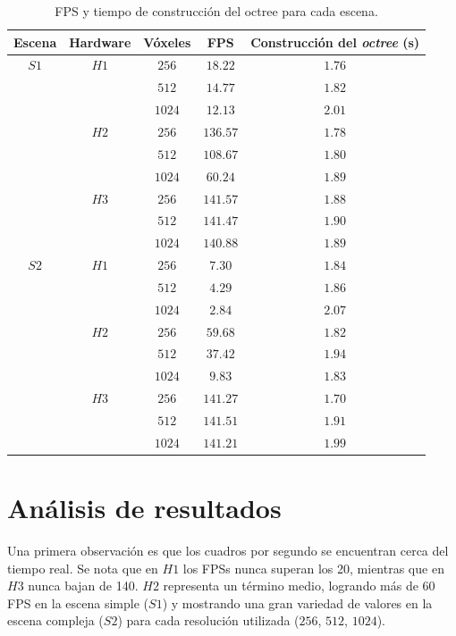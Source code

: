 \begin{table}[ht]
\centering
\begin{tabular}{|c|c|c|c|c|}
	\hline
	\textbf{Escena} & \textbf{Hardware} & \textbf{Vóxeles} & \textbf{FPS} & \textbf{Construcción del \textit{octree} (s)} \\
	\hline
	$S1$ & $H1$ & $256$ & $18.22$ & $1.76$ \\
	\cline{3-5}
	 & & $512$ & $14.77$ & $1.82$ \\
	\cline{3-5}
	 & & $1024$ & $12.13$ & $2.01$ \\
	\cline{2-5}
	 & $H2$ & $256$ & $136.57$ & $1.78$ \\
	\cline{3-5}
	 & & $512$ & $108.67$ & $1.80$ \\
	\cline{3-5}
	 & & $1024$ & $60.24$ & $1.89$ \\
	\cline{2-5}
	 & $H3$ & $256$ & $141.57$ & $1.88$ \\
	\cline{3-5}
	 & & $512$ & $141.47$ & $1.90$ \\
	\cline{3-5}
	 & & $1024$ & $140.88$ & $1.89$ \\
	\hline
	$S2$ & $H1$ & $256$ & $7.30$ & $1.84$ \\
	\cline{3-5}
	 & & $512$ & $4.29$ & $1.86$ \\
	\cline{3-5}
	 & & $1024$ & $2.84$ & $2.07$ \\
	\cline{2-5}
	 & $H2$ & $256$ & $59.68$ & $1.82$ \\
	\cline{3-5}
	 & & $512$ & $37.42$ & $1.94$ \\
	\cline{3-5}
	 & & $1024$ & $9.83$ & $1.83$ \\
	\cline{2-5}
	 & $H3$ & $256$ & $141.27$ & $1.70$ \\
	\cline{3-5}
	 & & $512$ & $141.51$ & $1.91$ \\
	\cline{3-5}
	 & & $1024$ & $141.21$ & $1.99$ \\
	\hline
\end{tabular}
\caption{FPS y tiempo de construcción del octree para cada escena.}
\label{tab:experiment-results}
\end{table}

\section{Análisis de resultados}

Una primera observación es que los cuadros por segundo se encuentran cerca del tiempo real.
Se nota que en $H1$ los FPSs nunca superan los 20, mientras que en $H3$ nunca bajan de 140.
$H2$ representa un término medio, logrando más de 60 FPS en la escena simple ($S1$) y mostrando una gran variedad de valores en la escena compleja ($S2$) para cada resolución utilizada ($256$, $512$, $1024$).


